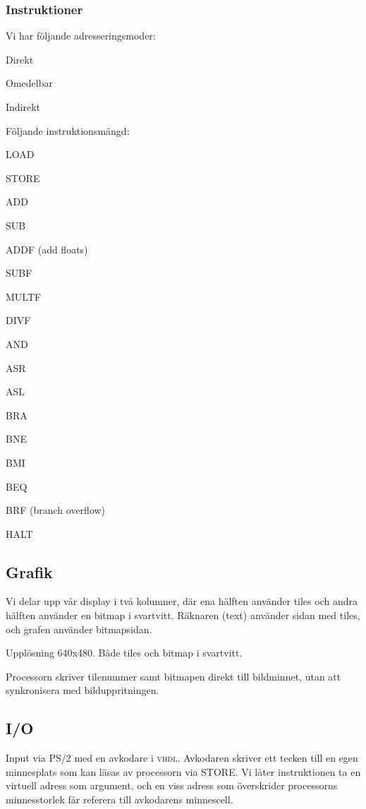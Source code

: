 \documentclass[]{article}
\begin{document}
\subsubsection{Instruktioner}
Vi har följande adresseringsmoder:
\begin{itemize*}
\item Direkt
\item Omedelbar
\item Indirekt 
\end{itemize*}
Följande instruktionsmängd:
\begin{itemize*}
\item LOAD
\item STORE
\item ADD
\item SUB
\item ADDF (add floats)
\item SUBF
\item MULTF
\item DIVF
\item AND
\item ASR
\item ASL
\item BRA
\item BNE
\item BMI
\item BEQ
\item BRF (branch overflow)
\item HALT	
\end{itemize*}

\subsection{Grafik} 
Vi delar upp vår display i två kolumner, där ena hälften använder tiles och andra hälften använder en bitmap i svartvitt. Räknaren (text) använder sidan med tiles, och grafen använder bitmapsidan.

Upplösning 640x480. Både tiles och bitmap i svartvitt.

Processorn skriver tilenummer samt bitmapen direkt till bildminnet, utan att synkronisera med bilduppritningen.

\subsection{I/O}
Input via PS/2 med en avkodare i \textsc{vhdl}. Avkodaren skriver ett tecken till en egen minnesplats som kan läsas av processorn via STORE. Vi låter instruktionen ta en virtuell adress som argument, och en viss adress som överskrider processorns minnesstorlek får referera till avkodarens minnescell.
\end{document}
